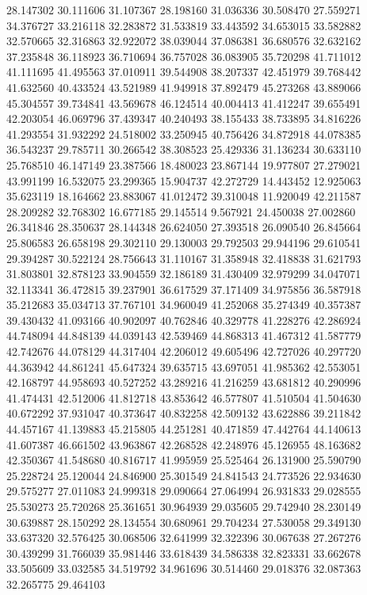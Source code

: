 28.147302
30.111606
31.107367
28.198160
31.036336
30.508470
27.559271
34.376727
33.216118
32.283872
31.533819
33.443592
34.653015
33.582882
32.570665
32.316863
32.922072
38.039044
37.086381
36.680576
32.632162
37.235848
36.118923
36.710694
36.757028
36.083905
35.720298
41.711012
41.111695
41.495563
37.010911
39.544908
38.207337
42.451979
39.768442
41.632560
40.433524
43.521989
41.949918
37.892479
45.273268
43.889066
45.304557
39.734841
43.569678
46.124514
40.004413
41.412247
39.655491
42.203054
46.069796
37.439347
40.240493
38.155433
38.733895
34.816226
41.293554
31.932292
24.518002
33.250945
40.756426
34.872918
44.078385
36.543237
29.785711
30.266542
38.308523
25.429336
31.136234
30.633110
25.768510
46.147149
23.387566
18.480023
23.867144
19.977807
27.279021
43.991199
16.532075
23.299365
15.904737
42.272729
14.443452
12.925063
35.623119
18.164662
23.883067
41.012472
39.310048
11.920049
42.211587
28.209282
32.768302
16.677185
29.145514
9.567921
24.450038
27.002860
26.341846
28.350637
28.144348
26.624050
27.393518
26.090540
26.845664
25.806583
26.658198
29.302110
29.130003
29.792503
29.944196
29.610541
29.394287
30.522124
28.756643
31.110167
31.358948
32.418838
31.621793
31.803801
32.878123
33.904559
32.186189
31.430409
32.979299
34.047071
32.113341
36.472815
39.237901
36.617529
37.171409
34.975856
36.587918
35.212683
35.034713
37.767101
34.960049
41.252068
35.274349
40.357387
39.430432
41.093166
40.902097
40.762846
40.329778
41.228276
42.286924
44.748094
44.848139
44.039143
42.539469
44.868313
41.467312
41.587779
42.742676
44.078129
44.317404
42.206012
49.605496
42.727026
40.297720
44.363942
44.861241
45.647324
39.635715
43.697051
41.985362
42.553051
42.168797
44.958693
40.527252
43.289216
41.216259
43.681812
40.290996
41.474431
42.512006
41.812718
43.853642
46.577807
41.510504
41.504630
40.672292
37.931047
40.373647
40.832258
42.509132
43.622886
39.211842
44.457167
41.139883
45.215805
44.251281
40.471859
47.442764
44.140613
41.607387
46.661502
43.963867
42.268528
42.248976
45.126955
48.163682
42.350367
41.548680
40.816717
41.995959
25.525464
26.131900
25.590790
25.228724
25.120044
24.846900
25.301549
24.841543
24.773526
22.934630
29.575277
27.011083
24.999318
29.090664
27.064994
26.931833
29.028555
25.530273
25.720268
25.361651
30.964939
29.035605
29.742940
28.230149
30.639887
28.150292
28.134554
30.680961
29.704234
27.530058
29.349130
33.637320
32.576425
30.068506
32.641999
32.322396
30.067638
27.267276
30.439299
31.766039
35.981446
33.618439
34.586338
32.823331
33.662678
33.505609
33.032585
34.519792
34.961696
30.514460
29.018376
32.087363
32.265775
29.464103
